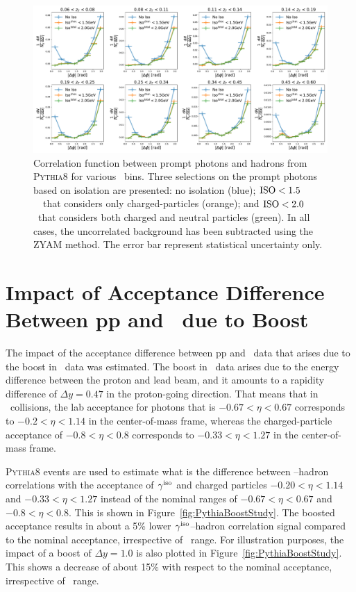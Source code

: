 \begin{figure}
\centering
\includegraphics[width = 1.0 \textwidth]{Checks_Systematics/PythiaStudyNeutralIso}
\caption{Correlation function between prompt photons and hadrons from \textsc{Pythia8} for various \zt~bins. Three selections on the prompt photons based on isolation are presented: no isolation (blue); $\mathrm{ISO}< 1.5$~\GeVc~that considers only charged-particles (orange); and $\mathrm{ISO}<2.0$ \GeVc~that considers both charged and neutral particles (green). In all cases, the uncorrelated background has been subtracted using the ZYAM method. The error bar represent statistical uncertainty only. }
\label{fig:PythiaNeutralIsolation}
\end{figure}


\section{Impact of Acceptance Difference Between pp and \pPb~due to Boost}
\label{sec:bootstudy}

The impact of the acceptance difference between pp and \pPb~data that arises due to the boost in \pPb~data was estimated. The boost in \pPb~data arises due to the energy difference between the proton and lead beam, and it amounts to a rapidity difference of $\Delta y = 0.47$  in the proton-going direction. That means that in \pPb~collisions, the lab acceptance for photons that is $-0.67<\eta<0.67$ corresponds to $-0.2<\eta<1.14$ in the center-of-mass frame, whereas the charged-particle acceptance of $-0.8<\eta<0.8$ corresponds to $-0.33<\eta<1.27$  in the center-of-mass frame. 

\textsc{Pythia8} events are used to estimate what is the difference between \gammaiso--hadron correlations with the acceptance of $\gamma^\mathrm{iso}$ and charged particles  $-0.20<\eta<1.14$ and $-0.33<\eta<1.27$ instead of the nominal ranges of $-0.67<\eta<0.67$ and $-0.8<\eta<0.8$. This is shown in Figure~\ref{fig:PythiaBoostStudy}. The boosted acceptance results in about a 5\% lower $\gamma^\mathrm{iso}$--hadron correlation signal compared to the nominal acceptance, irrespective of \zt~range. For illustration purposes, the impact of a boost of $\Delta y =1.0$ is also plotted in Figure~\ref{fig:PythiaBoostStudy}. This shows a decrease of about 15$\%$  with respect to the nominal acceptance, irrespective of \zt~range. 


